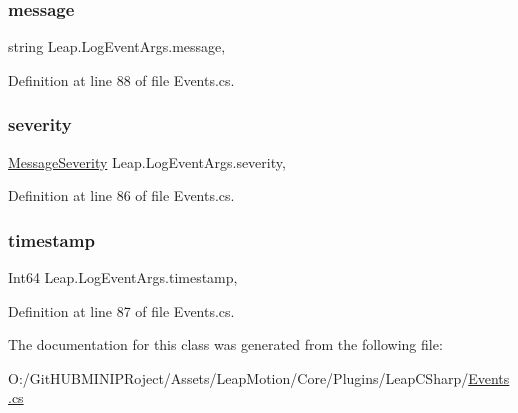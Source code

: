 \subsubsection{\texorpdfstring{message}{message}}
{\footnotesize\ttfamily string Leap.\+Log\+Event\+Args.\+message\hspace{0.3cm}{\ttfamily [get]}, {\ttfamily [set]}}



Definition at line 88 of file Events.\+cs.

\mbox{\label{class_leap_1_1_log_event_args_adabdd39dd8a123deae8d437be7464262}} 
\subsubsection{\texorpdfstring{severity}{severity}}
{\footnotesize\ttfamily \mbox{\hyperlink{namespace_leap_a4341f6495947222d3a86fcbb0c2b629d}{Message\+Severity}} Leap.\+Log\+Event\+Args.\+severity\hspace{0.3cm}{\ttfamily [get]}, {\ttfamily [set]}}



Definition at line 86 of file Events.\+cs.

\mbox{\label{class_leap_1_1_log_event_args_a793248f446f8e35b7f5540ddb673639b}} 
\subsubsection{\texorpdfstring{timestamp}{timestamp}}
{\footnotesize\ttfamily Int64 Leap.\+Log\+Event\+Args.\+timestamp\hspace{0.3cm}{\ttfamily [get]}, {\ttfamily [set]}}



Definition at line 87 of file Events.\+cs.



The documentation for this class was generated from the following file\+:\begin{DoxyCompactItemize}
\item 
O\+:/\+Git\+H\+U\+B\+M\+I\+N\+I\+P\+Roject/\+Assets/\+Leap\+Motion/\+Core/\+Plugins/\+Leap\+C\+Sharp/\mbox{\hyperlink{_events_8cs}{Events.\+cs}}\end{DoxyCompactItemize}
